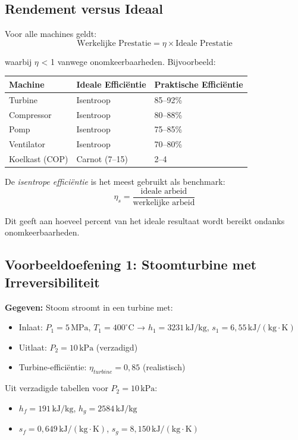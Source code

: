\documentclass[a4paper,11pt,twoside]{report}
\begin{document}
\subsection*{Rendement versus Ideaal}

Voor alle machines geldt:
\[
\text{Werkelijke Prestatie} = \eta \times \text{Ideale Prestatie}
\]

waarbij $\eta$ < 1 vanwege onomkeerbaarheden. Bijvoorbeeld:
\begin{table}[h]
\centering
\begin{tabular}{@{}lll@{}}
\toprule
\textbf{Machine} & \textbf{Ideale Efficiëntie} & \textbf{Praktische Efficiëntie} \\
\midrule
Turbine & Isentroop & 85–92\% \\
Compressor & Isentroop & 80–88\% \\
Pomp & Isentroop & 75–85\% \\
Ventilator & Isentroop & 70–80\% \\
Koelkast (COP) & Carnot (7–15) & 2–4 \\
\bottomrule
\end{tabular}
\end{table}

De \textit{isentrope efficiëntie} is het meest gebruikt als benchmark:
\[
\eta_s = \frac{\text{ideale arbeid}}{\text{werkelijke arbeid}}
\]

Dit geeft aan hoeveel percent van het ideale resultaat wordt bereikt ondanks onomkeerbaarheden.

\subsection*{Voorbeeldoefening 1: Stoomturbine met Irreversibiliteit}

\textbf{Gegeven:} Stoom stroomt in een turbine met:
\begin{itemize}
    \item Inlaat: $P_1 = 5\,\mathrm{MPa}$, $T_1 = 400^\circ\mathrm{C}$ → $h_1 = 3231\,\mathrm{kJ/kg}$, $s_1 = 6,55\,\mathrm{kJ/(kg \cdot K)}$
    \item Uitlaat: $P_2 = 10\,\mathrm{kPa}$ (verzadigd)
    \item Turbine-efficiëntie: $\eta_{turbine} = 0,85$ (realistisch)
\end{itemize}

Uit verzadigde tabellen voor $P_2 = 10\,\mathrm{kPa}$:
\begin{itemize}
    \item $h_f = 191\,\mathrm{kJ/kg}$, $h_g = 2584\,\mathrm{kJ/kg}$
    \item $s_f = 0,649\,\mathrm{kJ/(kg \cdot K)}$, $s_g = 8,150\,\mathrm{kJ/(kg \cdot K)}$
\end{itemize}
\end{document}
